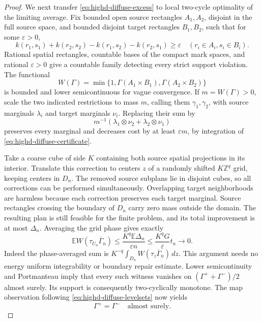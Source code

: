 \documentclass[11pt,reqno]{amsart}
\theoremstyle{definition}
\theoremstyle{remark}
\numberwithin{equation}{section}
\newcommand{\E}{\mathbb E}
\begin{document}
\begin{proof}
We next transfer \eqref{eq:highd-diffuse-excess} to local
two-cycle optimality of the limiting average. Fix bounded open source
rectangles \(A_1,A_2\), disjoint in the full source space, and
bounded disjoint target rectangles \(B_1,B_2\), such that for some
\(\varepsilon>0\),
\begin{equation}
 k(r_1,s_1)+k(r_2,s_2)-k(r_1,s_2)-k(r_2,s_1)
       \ge\varepsilon
 \quad(r_i\in A_i, s_i\in B_i).
 \label{eq:highd-diffuse-certificate}
\end{equation}
Rational spatial rectangles, countable bases of the compact mark
spaces, and rational \(\varepsilon>0\) give a countable family
detecting every strict support violation. The functional
\[
 W(\Gamma)=\min\{1,\Gamma(A_1\times B_1),
                        \Gamma(A_2\times B_2)\}
\]
is bounded and lower semicontinuous for vague convergence. If
\(m=W(\Gamma)>0\), scale the two indicated restrictions to mass
\(m\), calling them \(\gamma_1,\gamma_2\), with source marginals
\(\lambda_i\) and target marginals \(\nu_i\). Replacing their
sum by
\[
       m^{-1}(\lambda_1\otimes\nu_2+\lambda_2\otimes\nu_1)
\]
preserves every marginal and decreases cost by at least
\(\varepsilon m\), by integration of
\eqref{eq:highd-diffuse-certificate}.

Take a coarse cube of side \(K\) containing both source spatial
projections in its interior. Translate this correction to centers
\(z\) of a randomly shifted \(K\mathbb Z^q\) grid, keeping centers
in \(D_n\). The removed source subplans lie in disjoint cubes,
so all corrections can be performed simultaneously. Overlapping
target neighborhoods are harmless because each correction preserves
each target marginal. Source rectangles crossing the boundary of
\(D_n\) carry zero mass outside the domain. The resulting plan is
still feasible for the finite problem, and its total improvement is
at most \(\Delta_n\). Averaging the grid phase gives exactly
\begin{equation}
 \E W(\tau_{U_n}\overline\Gamma_n)
   \le\frac{K^q\E\Delta_n}{\varepsilon n}
   \le\frac{K^qG}{\varepsilon}t_n\longrightarrow0.
 \label{eq:highd-diffuse-packing}
\end{equation}
Indeed the phase-averaged sum is
\(K^{-q}\int_{D_n}W(\tau_z\overline\Gamma_n)\,dz\).
This argument needs no energy uniform integrability or boundary
repair estimate. Lower semicontinuity and Portmanteau imply that
every such witness vanishes on \((\Gamma^++\Gamma^-)/2\)
almost surely. Its support is consequently two-cyclically monotone.
The map observation following
\eqref{eq:highd-diffuse-levelsets} now yields
\begin{equation}
                 \Gamma^+=\Gamma^-\quad\text{almost surely}.
 \label{eq:highd-diffuse-equality}
\end{equation}


\end{proof}
\end{document}
